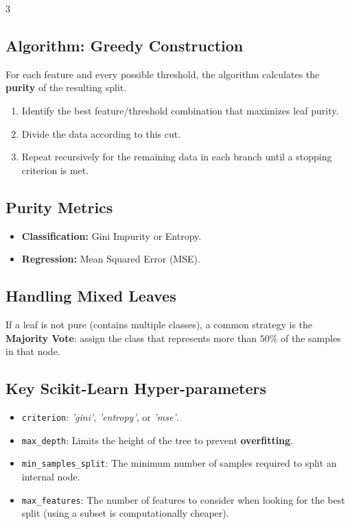 \documentclass[10pt, a4paper, landscape]{article}
\begin{document}
\begin{multicols*}{3}
\subsection*{Algorithm: Greedy Construction}
For each feature and every possible threshold, the algorithm calculates the \textbf{purity} of the resulting split.
\begin{enumerate}
    \item Identify the best feature/threshold combination that maximizes leaf purity.
    \item Divide the data according to this cut.
    \item Repeat recursively for the remaining data in each branch until a stopping criterion is met.
\end{enumerate}

\subsection*{Purity Metrics}
\begin{itemize}
    \item \textbf{Classification:} Gini Impurity or Entropy.
    \item \textbf{Regression:} Mean Squared Error (MSE).
\end{itemize}

\subsection*{Handling Mixed Leaves}
If a leaf is not pure (contains multiple classes), a common strategy is the \textbf{Majority Vote}: assign the class that represents more than $50\%$ of the samples in that node.

\subsection*{Key Scikit-Learn Hyper-parameters}
\begin{itemize}
    \item \texttt{criterion}: \textit{'gini'}, \textit{'entropy'}, or \textit{'mse'}.
    \item \texttt{max\_depth}: Limits the height of the tree to prevent \textbf{overfitting}.
    \item \texttt{min\_samples\_split}: The minimum number of samples required to split an internal node.
    \item \texttt{max\_features}: The number of features to consider when looking for the best split (using a subset is computationally cheaper).
\end{itemize}


\end{multicols*}
\end{document}
